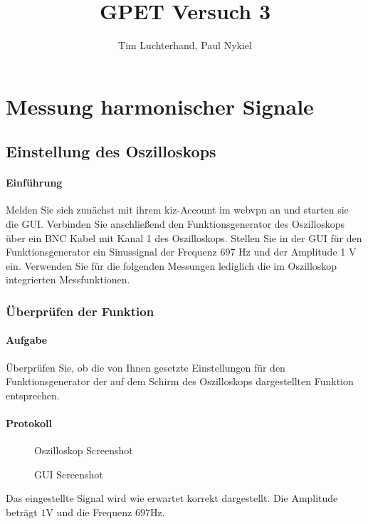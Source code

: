 \documentclass[10pt]{report}
\author{Tim Luchterhand, Paul Nykiel}
\title{GPET Versuch 3}
\begin{document}
        \maketitle

        \section{Messung harmonischer Signale}
        \subsection{Einstellung des Oszilloskops}
        \paragraph{Einführung}
        Melden Sie sich zunächst mit ihrem kiz-Account im webvpn an und starten sie die GUI.\@
        Verbinden Sie anschließend den Funktionsgenerator des Oszilloskops über ein BNC Kabel
        mit Kanal 1 des Oszilloskops. Stellen Sie in der GUI für den Funktionsgenerator ein Sinussignal der Frequenz 697 Hz und der Amplitude 1 V ein. Verwenden Sie für die folgenden
        Messungen lediglich die im Oszilloskop integrierten Messfunktionen.

        \subsubsection{Überprüfen der Funktion}
        \paragraph{Aufgabe}
        Überprüfen Sie, ob die von Ihnen gesetzte Einstellungen für den Funktionsgenerator
        der auf dem Schirm des Oszilloskops dargestellten Funktion entsprechen.

        \paragraph{Protokoll}
        \begin{center}
            \begin{figure}[H]
              \caption{Oszilloskop Screenshot}
            \end{figure}
            \begin{figure}[H]
              \caption{GUI Screenshot}
            \end{figure}
        \end{center}
        Das eingestellte Signal wird wie erwartet korrekt dargestellt. Die Amplitude
        beträgt $1\si{\volt}$ und die Frequenz $697\si{\hertz}$.
\end{document}
